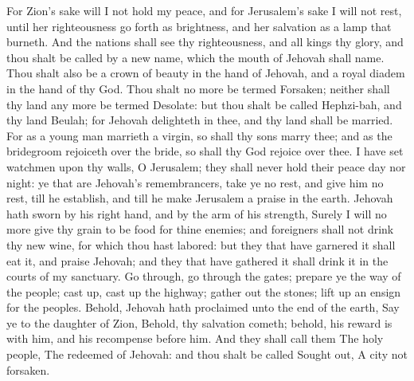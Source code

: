 For Zion’s sake will I not hold my peace, and for Jerusalem’s sake I will not rest, until her righteousness go forth as brightness, and her salvation as a lamp that burneth. And the nations shall see thy righteousness, and all kings thy glory, and thou shalt be called by a new name, which the mouth of Jehovah shall name. Thou shalt also be a crown of beauty in the hand of Jehovah, and a royal diadem in the hand of thy God. Thou shalt no more be termed Forsaken; neither shall thy land any more be termed Desolate: but thou shalt be called Hephzi-bah, and thy land Beulah; for Jehovah delighteth in thee, and thy land shall be married. For as a young man marrieth a virgin, so shall thy sons marry thee; and as the bridegroom rejoiceth over the bride, so shall thy God rejoice over thee.  I have set watchmen upon thy walls, O Jerusalem; they shall never hold their peace day nor night: ye that are Jehovah’s remembrancers, take ye no rest, and give him no rest, till he establish, and till he make Jerusalem a praise in the earth. Jehovah hath sworn by his right hand, and by the arm of his strength, Surely I will no more give thy grain to be food for thine enemies; and foreigners shall not drink thy new wine, for which thou hast labored: but they that have garnered it shall eat it, and praise Jehovah; and they that have gathered it shall drink it in the courts of my sanctuary.  Go through, go through the gates; prepare ye the way of the people; cast up, cast up the highway; gather out the stones; lift up an ensign for the peoples. Behold, Jehovah hath proclaimed unto the end of the earth, Say ye to the daughter of Zion, Behold, thy salvation cometh; behold, his reward is with him, and his recompense before him. And they shall call them The holy people, The redeemed of Jehovah: and thou shalt be called Sought out, A city not forsaken. 

